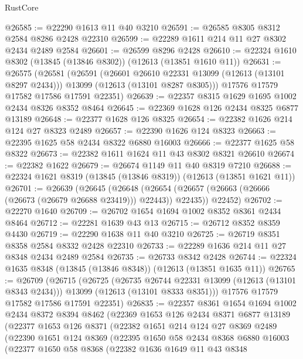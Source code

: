 \begin{lexlean}{RustCore}
\begin{coremodule}
@26585 := @22290 @1613 @11 @40 @3210
@26591 := @26585 @8305 @8312 @2584 @8286 @2428 @22310
@26599 := @22289 @1611 @214 @11 @27 @8302 @2434 @2489 @2584
@26601 := @26599 @8296 @2428
@26610 := @22324 @1610 @8302 (@13845 (@13846 @8302)) (@12613 (@13851 @1610 @11))
@26631 := @26575
    (@26581
      (@26591
        (@26601 @26610 @22331 @13099 (@12613 (@13101 @8297 @2434)))
        @13099
        (@12613 (@13101 @8287 @8305)))
      @17576
      @17579
      @17582
      @17586
      @17591
      @22351)
@26639 := @22357 @8315 @1629 @1695 @1002 @2434 @8326 @8352 @8464
@26645 := @22369 @1628 @126 @2434 @8325 @6877 @13189
@26648 := @22377 @1628 @126 @8325
@26654 := @22382 @1626 @214 @124 @27 @8323 @2489
@26657 := @22390 @1626 @124 @8323
@26663 := @22395 @1625 @58 @2434 @8322 @6880 @16003
@26666 := @22377 @1625 @58 @8322
@26673 := @22382 @1611 @1624 @11 @43 @8302 @8321 @26610
@26674 := @22382 @1622
@26679 := @26674 @1149 @11 @40 @8319 @7210
@26688 := @22324 @1621 @8319 (@13845 (@13846 @8319)) (@12613 (@13851 @1621 @11))
@26701 := @26639
    (@26645
      (@26648 (@26654 (@26657 (@26663 (@26666 (@26673 (@26679 @26688 @23419))) @22443)) @22435))
      @22452)
@26702 := @22270 @1640
@26709 := @26702 @1654 @1694 @1002 @8352 @8361 @2434 @8464
@26712 := @22281 @1639 @43 @13
@26715 := @26712 @8352 @8359 @4430
@26719 := @22290 @1638 @11 @40 @3210
@26725 := @26719 @8351 @8358 @2584 @8332 @2428 @22310
@26733 := @22289 @1636 @214 @11 @27 @8348 @2434 @2489 @2584
@26735 := @26733 @8342 @2428
@26744 := @22324 @1635 @8348 (@13845 (@13846 @8348)) (@12613 (@13851 @1635 @11))
@26765 := @26709
    (@26715
      (@26725
        (@26735 @26744 @22331 @13099 (@12613 (@13101 @8343 @2434)))
        @13099
        (@12613 (@13101 @8333 @8351)))
      @17576
      @17579
      @17582
      @17586
      @17591
      @22351)
@26835 := @22357
    @8361
    @1654
    @1694
    @1002
    @2434
    @8372
    @8394
    @8462
    (@22369
      @1653
      @126
      @2434
      @8371
      @6877
      @13189
      (@22377
        @1653
        @126
        @8371
        (@22382
          @1651
          @214
          @124
          @27
          @8369
          @2489
          (@22390
            @1651
            @124
            @8369
            (@22395
              @1650
              @58
              @2434
              @8368
              @6880
              @16003
              (@22377
                @1650
                @58
                @8368
                (@22382
                  @1636
                  @1649
                  @11
                  @43
                  @8348

\end{coremodule}
\end{lexlean}
